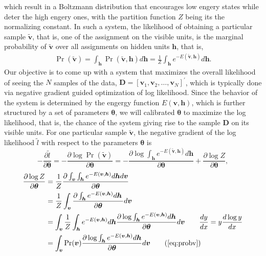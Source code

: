 \documentclass[11pt]{article}
\newcommand{\vh}{\boldsymbol{h}}
\newcommand{\vv}{\boldsymbol{v}}
\newcommand{\mD}{\boldsymbol{D}}
\newcommand{\vvt}{\tilde{\vv}}
\newcommand{\pEC}{\boldsymbol{\theta}}
\newcommand{\DRV}[2]{\frac{d #1}{d #2}}
\newcommand{\PDV}[2]{\frac{\partial #1}{\partial #2}}
\begin{document}
which result in a Boltzmann distribution that encourages low engery states while deter the high engery ones, with the partition function $Z$ being its the normalizing constant. In such a system, the likelihood of obtaining a particular sample $\vvt$, that is, one of the assignment on the visible units, is the marginal probability of $\vvt$ over all assignments on hidden units $\vh$, that is,
\begin{equation} \label{eq:probv}
  \begin{split}
    \Pr(\vvt) = \int_{\vh}{\Pr(\vvt, \vh)d\vh} = \frac{1}{Z} \int_{\vh}{e^{-E(\vvt, \vh)}d\vh}.
  \end{split}
\end{equation} 
Our objective is to come up with a system that maximizes the overall likelihood of seeing the $N$ samples of the data, $\mD=[\vv_1, \vv_2, \dots, \vv_N]^{\prime}$, which is typically done via negative gradient guided optimization of log likelihood. Since the behavior of the system is determined by the engergy function $E(\vv, \vh)$, which is further structured by a set of parameters $\pEC$, we will calibrated $\pEC$ to maximize the log likelihood, that is, the chance of the system giving rise to the sample $\mD$ on its visible units. For one particular sample $\vvt$, the negative gradient of the log likelihood $\tilde{l}$ with respect to the parameters $\pEC$ is
\begin{equation*}
  -\PDV{\tilde{l}}{\pEC} = -\PDV{\log{\Pr(\vvt)}}{\pEC} = -\PDV{\log{\int_{\vh}{e^{-E(\vvt, \vh)}}{d\vh}}}{\pEC} + \PDV{\log{Z}}{\pEC}, 
\end{equation*}
\begin{equation*}
  \begin{split}
    \PDV{\log{Z}}{\pEC} &= \frac{1}{Z}
    \PDV
    {
      \int_{\vv}
      {
        \int_{\vh} {e^{-E(\vv, \vh)}} {d\vh}
      }{d\vv}
    }{\pEC} \\
    &= \frac{1}{Z}
    \int_{\vv}
    {
      \PDV
      {
        \int_{\vh} {e^{-E(\vv, \vh)}} {d\vh}\,
      }{\pEC}
    }{d\vv} \\ 
    &= \int_{\vv}
    {
      \frac{1}{Z} 
      \int_{\vh} {e^{-E(\vv, \vh)}} {d\vh}
      \PDV
      {
        \log
        {
          \int_{\vh} {e^{-E(\vv, \vh)}} {d\vh}
        }
      }{\pEC}
    }{d\vv} \qquad \DRV{y}{x} = y \DRV{\log{y}}{x} \\
    &= \int_{\vv}
    {
      \Pr(\vv) \PDV
      {
        \log
        {
          \int_{\vh} {e^{-E(\vv, \vh)}} {d\vh}
        }
      }{\pEC}
    }{d\vv} \qquad (\ref{eq:probv})
  \end{split}
\end{equation*}
\end{document}
